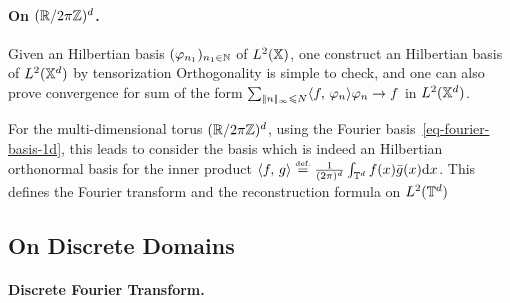 \paragraph{On $(\mathbb{R}/2\pi\mathbb{Z})^d$.}

Given an Hilbertian basis $(\varphi_{n_1})_{n_1 \in \mathbb{N}}$ of $L^2(\mathbb{X})$, one construct an Hilbertian basis of $L^2(\mathbb{X}^d)$ by tensorization
Orthogonality is simple to check, and one can also prove convergence for sum of the form $\sum_{|\!| n |\!|_\infty \leqslant N} \langle f,\,\varphi_n\rangle \varphi_n \rightarrow f$ in $L^2(\mathbb{X}^d)$.

For the multi-dimensional torus $(\mathbb{R}/2\pi\mathbb{Z})^d$, using the Fourier basis~\eqref{eq-fourier-basis-1d}, this leads to consider the basis
which is indeed an Hilbertian orthonormal basis for the inner product $\langle f,\,g\rangle \stackrel{\mbox{\upshape\tiny def.}}{=} \frac{1}{(2\pi)^d} \int_{\mathbb{T}^d} f(x)\bar g(x)\mathrm{d} x$. 
%
This defines the Fourier transform and the reconstruction formula on $L^2(\mathbb{T}^d)$

\subsection{On Discrete Domains}
\label{sec-fft-2d}

\paragraph{Discrete Fourier Transform.}


